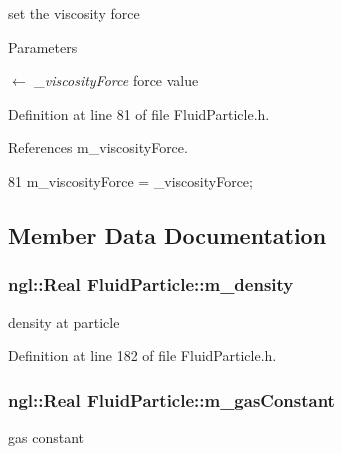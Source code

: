 set the viscosity force 


\begin{DoxyParams}{Parameters}
\item[\mbox{$\leftarrow$} {\em \_\-viscosityForce}]force value \end{DoxyParams}


Definition at line 81 of file FluidParticle.h.



References m\_\-viscosityForce.




\begin{DoxyCode}
81 { m_viscosityForce = _viscosityForce; }
\end{DoxyCode}




\subsection{Member Data Documentation}
\hypertarget{class_fluid_particle_ad2c0d1dae5fc90f4bbdce3ea51c6fb71}{
\subsubsection[{m\_\-density}]{\setlength{\rightskip}{0pt plus 5cm}ngl::Real {\bf FluidParticle::m\_\-density}}}
\label{class_fluid_particle_ad2c0d1dae5fc90f4bbdce3ea51c6fb71}


density at particle 



Definition at line 182 of file FluidParticle.h.

\hypertarget{class_fluid_particle_a19ddab3f4dfe30378c11d3afa11a4708}{
\subsubsection[{m\_\-gasConstant}]{\setlength{\rightskip}{0pt plus 5cm}ngl::Real {\bf FluidParticle::m\_\-gasConstant}}}
\label{class_fluid_particle_a19ddab3f4dfe30378c11d3afa11a4708}


gas constant 




